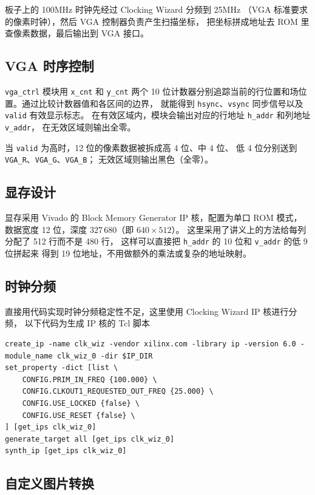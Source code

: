 \documentclass[12pt, a4paper]{ctexart}
\begin{document}
板子上的 100MHz 时钟先经过 Clocking Wizard 分频到 25MHz
（VGA 标准要求的像素时钟），然后 VGA 控制器负责产生扫描坐标，
把坐标拼成地址去 ROM 里查像素数据，最后输出到 VGA 接口。

\subsection{VGA 时序控制}

\texttt{vga\_ctrl} 模块用 \texttt{x\_cnt} 和 \texttt{y\_cnt} 
两个 10 位计数器分别追踪当前的行位置和场位置。通过比较计数器值和各区间的边界，
就能得到 \texttt{hsync}、\texttt{vsync} 同步信号以及 \texttt{valid} 有效显示标志。
在有效区域内，模块会输出对应的行地址 \texttt{h\_addr} 和列地址 \texttt{v\_addr}，
在无效区域则输出全零。

当 \texttt{valid} 为高时，12 位的像素数据被拆成高 4 位、中 4 位、
低 4 位分别送到 \texttt{VGA\_R}、\texttt{VGA\_G}、\texttt{VGA\_B}；
无效区域则输出黑色（全零）。

\subsection{显存设计}

显存采用 Vivado 的 Block Memory Generator IP 核，配置为单口 ROM 模式，
数据宽度 12 位，深度 327\,680（即 $640 \times 512$）。
这里采用了讲义上的方法给每列分配了 512 行而不是 480 行，
这样可以直接把 \texttt{h\_addr} 的 10 位和 \texttt{v\_addr} 的低 9 位拼起来
得到 19 位地址，不用做额外的乘法或复杂的地址映射。

\subsection{时钟分频}

直接用代码实现时钟分频稳定性不足，这里使用 Clocking Wizard IP 核进行分频，
以下代码为生成 IP 核的 Tcl 脚本

\begin{lstlisting}
create_ip -name clk_wiz -vendor xilinx.com -library ip -version 6.0 -module_name clk_wiz_0 -dir $IP_DIR
set_property -dict [list \
    CONFIG.PRIM_IN_FREQ {100.000} \
    CONFIG.CLKOUT1_REQUESTED_OUT_FREQ {25.000} \
    CONFIG.USE_LOCKED {false} \
    CONFIG.USE_RESET {false} \
] [get_ips clk_wiz_0]
generate_target all [get_ips clk_wiz_0]
synth_ip [get_ips clk_wiz_0]
\end{lstlisting}

\subsection{自定义图片转换}
\end{document}
